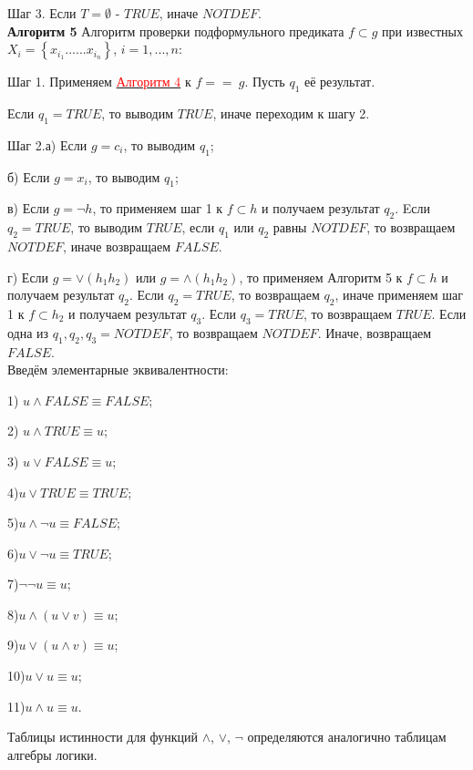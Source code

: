 \documentclass[12pt]{article}
\begin{document}
     Шаг 3. Если $ T= {\emptyset}$ - $TRUE$, иначе $NOTDEF$.
     \\
     
      \hypertarget{a5}{{\bf Алгоритм 5}} Алгоритм проверки подформульного предиката $f \subset g $ при известных $ X_{i} = \left\lbrace x_{i_{1}} ......x_{i_{n}}\right\rbrace $, $i = 1,...,n$:
    
     Шаг 1. Применяем \hyperlink{a3}{ \textcolor{red}{Алгоритм 4}}  к $f == \:g$. Пусть $q_{1}$ её результат.
     
      Если $q_{1} = TRUE$, то выводим $TRUE$, иначе переходим к шагу 2.
     
     Шаг 2.а) Если $ g = c_{i}$, то выводим $q_{1}$;
     
      б) Если $ g = x_{i}$, то выводим $q_{1}$;
      
    в) Если $ g = \neg h$, то применяем  шаг 1 к  $f\subset h$ и получаем результат $q_{2}$. Eсли $q_{2} = TRUE$, то выводим $TRUE$, если $q_{1}$ или $q_{2}$ равны $NOTDEF$, то возвращаем $NOTDEF$, иначе возвращаем $FALSE$.
    
    г) Если $ g = \vee (h_{1} h_{2})$ или  $ g = \wedge (h_{1} h_{2})$, то применяем  Алгоритм 5 к  $f\subset h$   и получаем результат $q_{2}$. Если $q_{2} = TRUE$, то возвращаем $q_{2}$, иначе применяем шаг 1 к $f\subset h_{2}$ и  получаем результат  $q_{3}$. Если $q_{3} = TRUE$, то возвращаем $TRUE$. Если одна из $q_{1}, q_{2}, q_{3} = NOTDEF$, то возвращаем $NOTDEF$. Иначе, возвращаем $FALSE$.
     \\
     
     Введём элементарные эквивалентности:
     
     1) $u\wedge FALSE\equiv FALSE$;
     
     2) $u\wedge TRUE\equiv u$;
     
     3) $u\vee FALSE\equiv u$;
     
     4)$u\vee TRUE\equiv TRUE$;
     
     5)$u \wedge \neg u \equiv FALSE$;
     
     6)$u \vee \neg u \equiv TRUE$;
     
     7)$\neg \neg u \equiv u$;
     
     8)$u\wedge (u \vee v)\equiv u$;
     
     9)$u\vee (u \wedge v)\equiv u$;
     
     10)$u \vee u \equiv u$;
     
     11)$u \wedge u \equiv u$.
     
     Таблицы истинности для функций $\wedge$, $\vee$, $\neg$ определяются аналогично таблицам алгебры логики.
     \\
     
\end{document}
